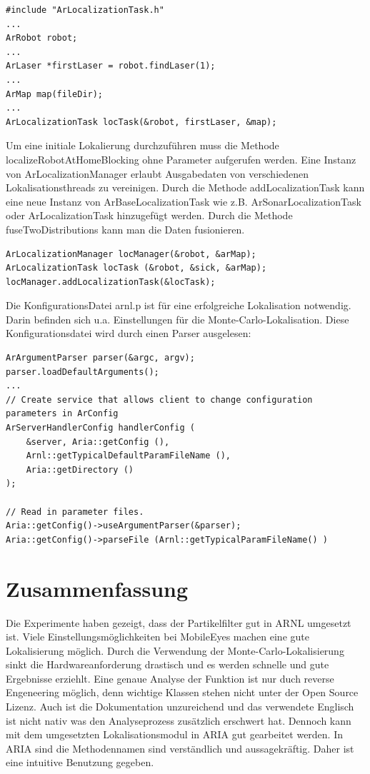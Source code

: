 \documentclass{article}
\begin{document}
\lstset{language=C++}
\begin{lstlisting}
#include "ArLocalizationTask.h"
...
ArRobot robot;
...
ArLaser *firstLaser = robot.findLaser(1);
...
ArMap map(fileDir);
...
ArLocalizationTask locTask(&robot, firstLaser, &map);
\end{lstlisting}
Um eine initiale Lokalierung durchzuf\"uhren muss die Methode localizeRobotAtHomeBlocking ohne Parameter aufgerufen werden.
Eine Instanz von ArLocalizationManager erlaubt Ausgabedaten von verschiedenen Lokalisationsthreads zu vereinigen. Durch die Methode addLocalizationTask kann eine neue Instanz von ArBaseLocalizationTask wie z.B. ArSonarLocalizationTask oder ArLocalizationTask hinzugef\"ugt werden. Durch die Methode fuseTwoDistributions kann man die Daten fusionieren.
\lstset{language=C++}
\begin{lstlisting}
ArLocalizationManager locManager(&robot, &arMap);
ArLocalizationTask locTask (&robot, &sick, &arMap);
locManager.addLocalizationTask(&locTask);
\end{lstlisting}

Die KonfigurationsDatei arnl.p ist f\"ur eine erfolgreiche Lokalisation notwendig. Darin befinden sich u.a. Einstellungen f\"ur die Monte-Carlo-Lokalisation.
Diese Konfigurationsdatei wird durch einen Parser ausgelesen:

\lstset{language=C++}
\begin{lstlisting}
ArArgumentParser parser(&argc, argv);
parser.loadDefaultArguments();
...
// Create service that allows client to change configuration parameters in ArConfig 
ArServerHandlerConfig handlerConfig (
	&server, Aria::getConfig (),
	Arnl::getTypicalDefaultParamFileName (),
	Aria::getDirectory ()
);

// Read in parameter files.
Aria::getConfig()->useArgumentParser(&parser);
Aria::getConfig()->parseFile (Arnl::getTypicalParamFileName() )
\end{lstlisting}


\newpage



\section{Zusammenfassung}

Die Experimente haben gezeigt, dass der Partikelfilter gut in ARNL umgesetzt ist. Viele Einstellungsm\"oglichkeiten bei MobileEyes machen eine gute Lokalisierung m\"oglich. Durch die Verwendung der Monte-Carlo-Lokalisierung sinkt die Hardwareanforderung drastisch und es werden schnelle und gute Ergebnisse erziehlt. Eine genaue Analyse der Funktion ist nur duch reverse Engeneering m\"oglich, denn wichtige Klassen stehen nicht unter der Open Source Lizenz. Auch ist die Dokumentation unzureichend und das verwendete Englisch ist nicht nativ was den Analyseprozess zus\"atzlich erschwert hat. 
Dennoch kann mit dem umgesetzten Lokalisationsmodul in ARIA gut gearbeitet werden.
In ARIA sind die Methodennamen sind verst\"andlich und aussagekr\"aftig. Daher ist eine intuitive Benutzung gegeben.
\end{document}
